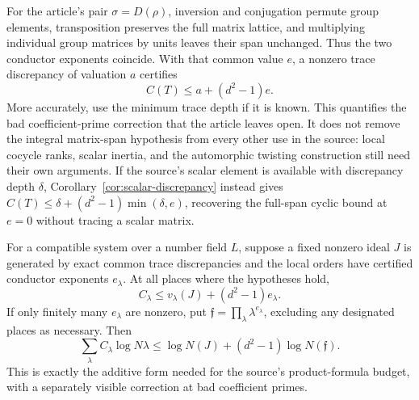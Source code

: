 For the article's pair $\sigma=D(\rho)$, inversion and conjugation
permute group elements, transposition preserves the full matrix lattice,
and multiplying individual group matrices by units leaves their span
unchanged. Thus the two conductor exponents coincide. With that common
value $e$, a nonzero trace discrepancy of valuation $a$ certifies
\[
 C(T)\le a+(d^2-1)e.
\]
More accurately, use the minimum trace depth if it is known. This
quantifies the bad coefficient-prime correction that the article leaves
open. It does not remove the integral matrix-span hypothesis from every
other use in the source: local cocycle ranks, scalar inertia, and the
automorphic twisting construction still need their own arguments.
If the source's scalar element is available with discrepancy depth
$\delta$, Corollary~\ref{cor:scalar-discrepancy} instead gives
$C(T)\le\delta+(d^2-1)\min(\delta,e)$, recovering the full-span
cyclic bound at $e=0$ without tracing a scalar matrix.

For a compatible system over a number field $L$, suppose a fixed
nonzero ideal $J$ is generated by exact common trace discrepancies and
the local orders have certified conductor exponents $e_\lambda$. At all
places where the hypotheses hold,
\[
 C_\lambda\le v_\lambda(J)+(d^2-1)e_\lambda.
\]
If only finitely many $e_\lambda$ are nonzero, put
$\mathfrak f=\prod_\lambda\lambda^{e_\lambda}$, excluding any designated
places as necessary. Then
\[
 \sum_\lambda C_\lambda\log N\lambda
 \le\log N(J)+(d^2-1)\log N(\mathfrak f).
\]
This is exactly the additive form needed for the source's product-formula
budget, with a separately visible correction at bad coefficient primes.


